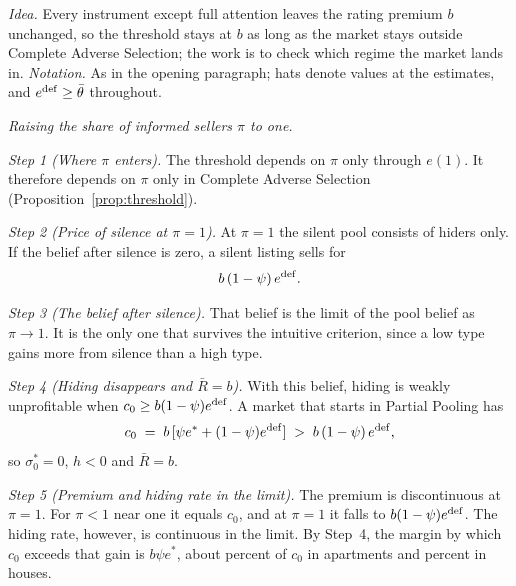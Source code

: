 \upshape
\emph{Idea.} Every instrument except full attention leaves the rating premium $b$ unchanged, so the threshold stays at $b$ as long as the market stays outside Complete Adverse Selection; the work is to check which regime the market lands in. \emph{Notation.} As in the opening paragraph; hats denote values at the estimates, and $e^{\rm def}\ge\bar\theta$ throughout.

\medskip\noindent\emph{Raising the share of informed sellers $\pi$ to one.}

\emph{Step 1 (Where $\pi$ enters).} The threshold depends on $\pi$ only through $e(1)$. It therefore depends on $\pi$ only in Complete Adverse Selection (Proposition~\ref{prop:threshold}).

\emph{Step 2 (Price of silence at $\pi=1$).} At $\pi=1$ the silent pool consists of hiders only. If the belief after silence is zero, a silent listing sells for
\begin{equation*}
    b\,(1-\psi)\,e^{\rm def}.
\end{equation*}

\emph{Step 3 (The belief after silence).} That belief is the limit of the pool belief as $\pi\to1$. It is the only one that survives the intuitive criterion, since a low type gains more from silence than a high type.

\emph{Step 4 (Hiding disappears and $\bar R=b$).} With this belief, hiding is weakly unprofitable when $c_0\ge b(1-\psi)e^{\rm def}$. A market that starts in Partial Pooling has
\begin{equation*}
    c_0\;=\;b\,[\psi e^*+(1-\psi)e^{\rm def}]\;>\;b\,(1-\psi)\,e^{\rm def},
\end{equation*}
so $\sigma_0^*=0$, $h<0$ and $\bar R=b$.

\emph{Step 5 (Premium and hiding rate in the limit).} The premium is discontinuous at $\pi=1$. For $\pi<1$ near one it equals $c_0$, and at $\pi=1$ it falls to $b(1-\psi)e^{\rm def}$. The hiding rate, however, is continuous in the limit. By Step~4, the margin by which $c_0$ exceeds that gain is $b\psi e^*$, about \attPiOneMarginApt{} percent of $c_0$ in apartments and \attPiOneMarginHouse{} percent in houses.

